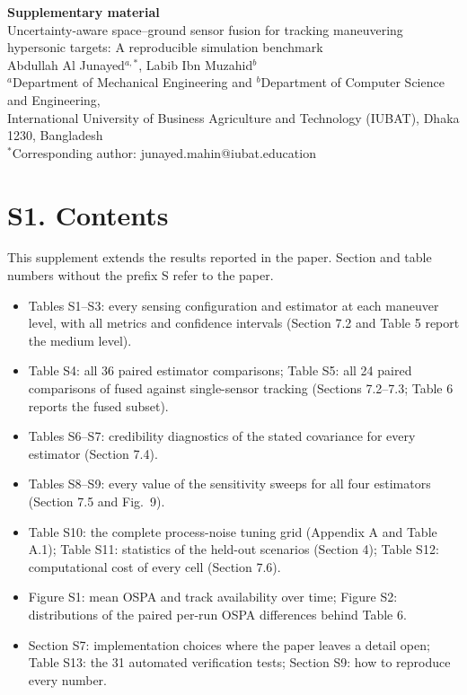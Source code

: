 \documentclass[11pt,a4paper]{article}
\begin{document}
\begin{center}
{\Large\bfseries Supplementary material}\\[6pt]
{\large Uncertainty-aware space--ground sensor fusion for tracking maneuvering hypersonic targets: A reproducible simulation benchmark}\\[10pt]
Abdullah Al Junayed$^{a,*}$, Labib Ibn Muzahid$^{b}$\\[4pt]
{\small $^a$Department of Mechanical Engineering and $^b$Department of Computer Science and Engineering,\\
International University of Business Agriculture and Technology (IUBAT), Dhaka 1230, Bangladesh\\
$^*$Corresponding author: junayed.mahin@iubat.education}
\end{center}

\section*{S1. Contents}

This supplement extends the results reported in the paper. Section and table numbers without the prefix S refer to the paper.

\begin{itemize}[leftmargin=*,itemsep=1pt]
\item Tables S1--S3: every sensing configuration and estimator at each maneuver level, with all metrics and confidence intervals (Section 7.2 and Table 5 report the medium level).
\item Table S4: all 36 paired estimator comparisons; Table S5: all 24 paired comparisons of fused against single-sensor tracking (Sections 7.2--7.3; Table 6 reports the fused subset).
\item Tables S6--S7: credibility diagnostics of the stated covariance for every estimator (Section 7.4).
\item Tables S8--S9: every value of the sensitivity sweeps for all four estimators (Section 7.5 and Fig.~9).
\item Table S10: the complete process-noise tuning grid (Appendix A and Table A.1); Table S11: statistics of the held-out scenarios (Section 4); Table S12: computational cost of every cell (Section 7.6).
\item Figure S1: mean OSPA and track availability over time; Figure S2: distributions of the paired per-run OSPA differences behind Table 6.
\item Section S7: implementation choices where the paper leaves a detail open; Table S13: the 31 automated verification tests; Section S9: how to reproduce every number.
\end{itemize}
\end{document}

